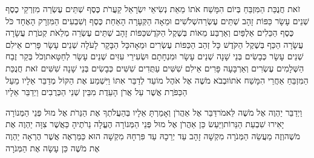 \documentclass[../main/main.tex]{subfiles}
\begin{document}
\begin{multicols*}{\ncols}
זֹאת חֲנֻכַּת הַמִּזְבֵּחַ בְּיוֹם הִמָּשַׁח אֹתוֹ מֵאֵת נְשִׂיאֵי יִשְׂרָאֵל קַעֲרֹת כֶּסֶף שְׁתֵּים עֶשְׂרֵה מִזְרְקֵי כֶסֶף שְׁנֵים עָשָׂר כַּפּוֹת זָהָב שְׁתֵּים עֶשְׂרֵה\PreVerseSpace{}שְׁלֹשִׁים וּמֵאָה הַקְּעָרָה הָאַחַת כֶּסֶף וְשִׁבְעִים הַמִּזְרָק הָאֶחָד כֹּל כֶּסֶף הַכֵּלִים אַלְפַּיִם וְאַרְבַּע מֵאוֹת בְּשֶׁקֶל הַקֹּדֶשׁ\PreVerseSpace{}כַּפּוֹת זָהָב שְׁתֵּים עֶשְׂרֵה מְלֵאֹת קְטֹרֶת עֲשָׂרָה עֲשָׂרָה הַכַּף בְּשֶׁקֶל הַקֹּדֶשׁ כָּל זְהַב הַכַּפּוֹת עֶשְׂרִים וּמֵאָה\PreVerseSpace{}כָּל הַבָּקָר לָעֹלָה שְׁנֵים עָשָׂר פָּרִים אֵילִם שְׁנֵים עָשָׂר כְּבָשִׂים בְּנֵי שָׁנָה שְׁנֵים עָשָׂר וּמִנְחָתָם וּשְׂעִירֵי עִזִּים שְׁנֵים עָשָׂר לְחַטָּאת\PreVerseSpace{}וְכֹל בְּקַר זֶבַח הַשְּׁלָמִים עֶשְׂרִים וְאַרְבָּעָה פָּרִים אֵילִם שִׁשִּׁים עַתֻּדִים שִׁשִּׁים כְּבָשִׂים בְּנֵי שָׁנָה שִׁשִּׁים זֹאת חֲנֻכַּת הַמִּזְבֵּחַ אַחֲרֵי הִמָּשַׁח אֹתוֹ\PreVerseSpace{}וּבְבֹא מֹשֶׁה אֶל אֹהֶל מוֹעֵד לְדַבֵּר אִתּוֹ וַיִּשְׁמַע אֶת הַקּוֹל מְדַבֵּר אֵלָיו מֵעַל הַכַּפֹּרֶת אֲשֶׁר עַל אֲרֹן הָעֵדֻת מִבֵּין שְׁנֵי הַכְּרֻבִים וַיְדַבֵּר אֵלָיו\OpenSection{}\par
{}וַיְדַבֵּר יַהְוֶה אֶל מֹשֶׁה לֵּאמֹר\PreVerseSpace{}דַּבֵּר אֶל אַהֲרֹן וְאָמַרְתָּ אֵלָיו בְּהַעֲלֹתְךָ אֶת הַנֵּרֹת אֶל מוּל פְּנֵי הַמְּנוֹרָה יָאִירוּ שִׁבְעַת הַנֵּרוֹת\PreVerseSpace{}וַיַּעַשׂ כֵּן אַהֲרֹן אֶל מוּל פְּנֵי הַמְּנוֹרָה הֶעֱלָה נֵרֹתֶיהָ כַּאֲשֶׁר צִוָּה יַהְוֶה אֶת מֹשֶׁה\PreVerseSpace{}וְזֶה מַעֲשֵׂה הַמְּנֹרָה מִקְשָׁה זָהָב עַד יְרֵכָהּ עַד פִּרְחָהּ מִקְשָׁה הוּא כַּמַּרְאֶה אֲשֶׁר הֶרְאָה יַהְוֶה אֶת מֹשֶׁה כֵּן עָשָׂה אֶת הַמְּנֹרָה\OpenSection{}\par

\end{multicols*}
\end{document}

